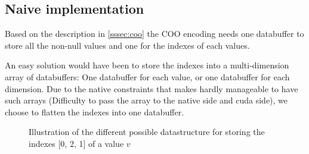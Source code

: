 \subsection{Naive implementation}

Based on the description in \ref{sssec:coo} the COO encoding needs one databuffer to store all the non-null values and one for the indexes of each values. 

An easy solution would have been to store the indexes into a multi-dimension array of databuffers: One databuffer for each value, or one databuffer for each dimension. Due to the native constraints that makes hardly manageable to have such arrays (Difficulty to pass the array to the native side and cuda side), we choose to flatten the indexes into one databuffer.

\begin{figure}[!h]
	\hfill
	\caption{Illustration of the different possible datastructure for storing the indexes  [0, 2, 1] of a value $v$ }
\end{figure}

